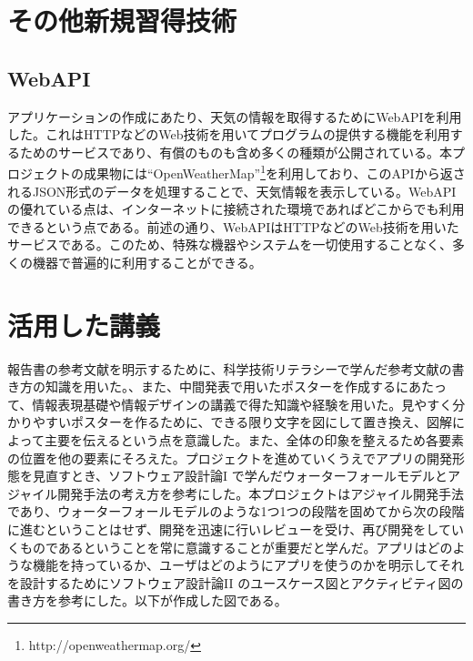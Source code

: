 \documentclass[openany,11pt,papersize]{jsbook}
\begin{document}
\begin{appendix}
\chapter{その他新規習得技術}
\section{WebAPI}
アプリケーションの作成にあたり、天気の情報を取得するためにWebAPIを利用した。これはHTTPなどのWeb技術を用いてプログラムの提供する機能を利用するためのサービスであり、有償のものも含め多くの種類が公開されている。本プロジェクトの成果物には``OpenWeatherMap''\footnote{http://openweathermap.org/}を利用しており、このAPIから返されるJSON形式のデータを処理することで、天気情報を表示している。WebAPIの優れている点は、インターネットに接続された環境であればどこからでも利用できるという点である。前述の通り、WebAPIはHTTPなどのWeb技術を用いたサービスである。このため、特殊な機器やシステムを一切使用することなく、多くの機器で普遍的に利用することができる。

\chapter{活用した講義}
 報告書の参考文献を明示するために、科学技術リテラシーで学んだ参考文献の書き方の知識を用いた。、また、中間発表で用いたポスターを作成するにあたって、情報表現基礎や情報デザインの講義で得た知識や経験を用いた。見やすく分かりやすいポスターを作るために、できる限り文字を図にして置き換え、図解によって主要を伝えるという点を意識した。また、全体の印象を整えるため各要素の位置を他の要素にそろえた。プロジェクトを進めていくうえでアプリの開発形態を見直すとき、ソフトウェア設計論I  で学んだウォーターフォールモデルとアジャイル開発手法の考え方を参考にした。本プロジェクトはアジャイル開発手法であり、ウォーターフォールモデルのような1つ1つの段階を固めてから次の段階に進むということはせず、開発を迅速に行いレビューを受け、再び開発をしていくものであるということを常に意識することが重要だと学んだ。アプリはどのような機能を持っているか、ユーザはどのようにアプリを使うのかを明示してそれを設計するためにソフトウェア設計論II  のユースケース図とアクティビティ図の書き方を参考にした。以下が作成した図である。



\end{appendix}
\end{document}
